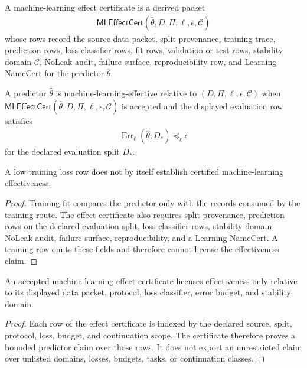 \begin{definition}
\label{def:philosophy-machine-learning-effect-certificate}
A machine-learning effect certificate is a derived packet
$$
\begin{gathered}
\mathsf{MLEffectCert}(\hat\theta,D,\Pi,\ell,\epsilon,\mathcal C)
\end{gathered}
$$
whose rows record the source data packet, split provenance, training
trace, prediction rows, loss-classifier rows, fit rows, validation or
test rows, stability domain $\mathcal C$, NoLeak audit, failure surface,
reproducibility row, and Learning NameCert for the predictor
$\hat\theta$.
\end{definition}

\begin{definition}
\label{def:philosophy-certified-machine-learning-effectiveness}
A predictor $\hat\theta$ is machine-learning-effective relative to
$(D,\Pi,\ell,\epsilon,\mathcal C)$ when
$\mathsf{MLEffectCert}(\hat\theta,D,\Pi,\ell,\epsilon,\mathcal C)$ is
accepted and the displayed evaluation row satisfies
$$
\begin{gathered}
\operatorname{Err}_{\ell}(\hat\theta;D_\ast)\preceq_{\ell}\epsilon
\end{gathered}
$$
for the declared evaluation split $D_\ast$.
\end{definition}

\begin{theorem}
\label{thm:philosophy-training-fit-not-learning-effectiveness}
A low training loss row does not by itself establish certified
machine-learning effectiveness.
\end{theorem}
\begin{proof}
Training fit compares the predictor only with the records consumed by
the training route. The effect certificate also requires split
provenance, prediction rows on the declared evaluation split, loss
classifier rows, stability domain, NoLeak audit, failure surface,
reproducibility, and a Learning NameCert. A training row omits these
fields and therefore cannot license the effectiveness claim.
\end{proof}

\begin{theorem}
\label{thm:philosophy-machine-learning-effectiveness-scope-relative}
An accepted machine-learning effect certificate licenses effectiveness
only relative to its displayed data packet, protocol, loss classifier,
error budget, and stability domain.
\end{theorem}
\begin{proof}
Each row of the effect certificate is indexed by the declared source,
split, protocol, loss, budget, and continuation scope. The certificate
therefore proves a bounded predictor claim over those rows. It does not
export an unrestricted claim over unlisted domains, losses, budgets,
tasks, or continuation classes.
\end{proof}

